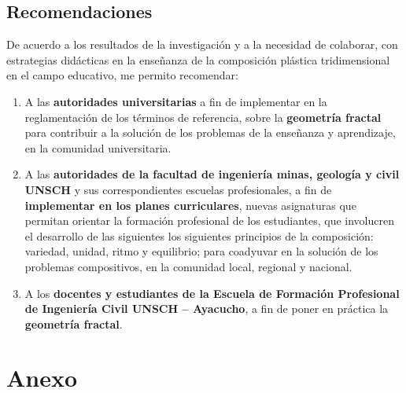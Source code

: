 \documentclass[12pt,]{report}
\begin{document}
\hypertarget{recomendaciones}{%
\section{Recomendaciones}\label{recomendaciones}}

De acuerdo a los resultados de la investigación y a la necesidad de colaborar, con estrategias
didácticas en la enseñanza de la composición plástica tridimensional en el campo educativo,
me permito recomendar:

\begin{enumerate}
\def\labelenumi{\arabic{enumi}.}
\item
  A las \textbf{autoridades universitarias} a fin de implementar en la reglamentación de los términos
  de referencia, sobre la \textbf{geometría fractal} para contribuir a la solución de los problemas
  de la enseñanza y aprendizaje, en la comunidad universitaria.
\item
  A las \textbf{autoridades de la facultad de ingeniería minas, geología y civil UNSCH} y sus correspondientes
  escuelas profesionales, a fin de \textbf{implementar en los planes curriculares},
  nuevas asignaturas que permitan orientar la formación profesional de los estudiantes,
  que involucren el desarrollo de las siguientes los siguientes principios de la composición: variedad,
  unidad, ritmo y equilibrio; para coadyuvar en la solución de los problemas compositivos,
  en la comunidad local, regional y nacional.
\item
  A los \textbf{docentes y estudiantes de la Escuela de Formación Profesional de Ingeniería
  Civil UNSCH -- Ayacucho}, a fin de poner en práctica la \textbf{geometría fractal}.
\end{enumerate}

\hypertarget{anexo}{%
\chapter*{Anexo}\label{anexo}}
\end{document}
